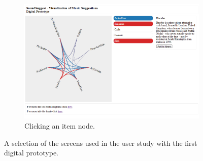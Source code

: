 \documentclass[a4paper,10pt,twocolumn]{article}
\begin{document}
\begin{appendices}
\begin{figure}
\begin{subfigure}[t]{0.3\textwidth}
						\includegraphics[width=\textwidth]{img/prototype_soundsuggest1_item_click}
						\caption{Clicking an item node.}
						\label{figure:prototype_soundsuggest1_item_click}
		\end{subfigure}
		\caption{A selection of the screens used in the user study with the first digital prototype.}%
		\label{figure:prototype_soundsuggest1}%
	\end{figure}


\end{appendices}
\end{document}
